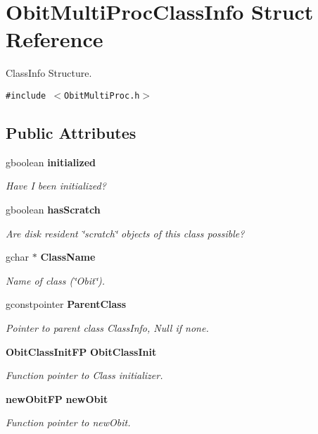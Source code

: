 \section{Obit\-Multi\-Proc\-Class\-Info Struct Reference}
\label{structObitMultiProcClassInfo}
Class\-Info Structure.  


{\tt \#include $<$Obit\-Multi\-Proc.h$>$}

\subsection*{Public Attributes}
\begin{CompactItemize}
\item 
gboolean {\bf initialized}
\begin{CompactList}\small\item\em Have I been initialized? \item\end{CompactList}\item 
gboolean {\bf has\-Scratch}
\begin{CompactList}\small\item\em Are disk resident \char`\"{}scratch\char`\"{} objects of this class possible? \item\end{CompactList}\item 
gchar $\ast$ {\bf Class\-Name}
\begin{CompactList}\small\item\em Name of class (\char`\"{}Obit\char`\"{}). \item\end{CompactList}\item 
gconstpointer {\bf Parent\-Class}
\begin{CompactList}\small\item\em Pointer to parent class Class\-Info, Null if none. \item\end{CompactList}\item 
{\bf Obit\-Class\-Init\-FP} {\bf Obit\-Class\-Init}
\begin{CompactList}\small\item\em Function pointer to Class initializer. \item\end{CompactList}\item 
{\bf new\-Obit\-FP} {\bf new\-Obit}
\begin{CompactList}\small\item\em Function pointer to new\-Obit. \item\end{CompactList}\item 

\end{CompactItemize}
